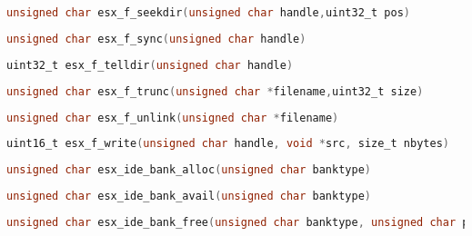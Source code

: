 \documentclass[11pt]{book}
\def\lthtmlcheckvsize{\ifdim\ht\sizebox<\vsize 
  \ifdim\wd\sizebox<\hsize\expandafter\hfill\fi \expandafter\vfill
  \else\expandafter\vss\fi}%
\begin{document}
{\newpage\clearpage
{}%
\begin{lstlisting}[language=C]
unsigned char esx_f_seekdir(unsigned char handle,uint32_t pos)
\end{lstlisting}%
\lthtmlfigureZ
\lthtmlcheckvsize\clearpage}

{\newpage\clearpage
{}%
\begin{lstlisting}[language=C]
unsigned char esx_f_sync(unsigned char handle)
\end{lstlisting}%
\lthtmlfigureZ
\lthtmlcheckvsize\clearpage}

{\newpage\clearpage
{}%
\begin{lstlisting}[language=C]
uint32_t esx_f_telldir(unsigned char handle)
\end{lstlisting}%
\lthtmlfigureZ
\lthtmlcheckvsize\clearpage}

{\newpage\clearpage
{}%
\begin{lstlisting}[language=C]
unsigned char esx_f_trunc(unsigned char *filename,uint32_t size)
\end{lstlisting}%
\lthtmlfigureZ
\lthtmlcheckvsize\clearpage}

{\newpage\clearpage
{}%
\begin{lstlisting}[language=C]
unsigned char esx_f_unlink(unsigned char *filename)
\end{lstlisting}%
\lthtmlfigureZ
\lthtmlcheckvsize\clearpage}

{\newpage\clearpage
{}%
\begin{lstlisting}[language=C]
uint16_t esx_f_write(unsigned char handle, void *src, size_t nbytes)
\end{lstlisting}%
\lthtmlfigureZ
\lthtmlcheckvsize\clearpage}

{\newpage\clearpage
{}%
\begin{lstlisting}[language=C]
unsigned char esx_ide_bank_alloc(unsigned char banktype)
\end{lstlisting}%
\lthtmlfigureZ
\lthtmlcheckvsize\clearpage}

{\newpage\clearpage
{}%
\begin{lstlisting}[language=C]
unsigned char esx_ide_bank_avail(unsigned char banktype)
\end{lstlisting}%
\lthtmlfigureZ
\lthtmlcheckvsize\clearpage}

{\newpage\clearpage
{}%
\begin{lstlisting}[language=C]
unsigned char esx_ide_bank_free(unsigned char banktype, unsigned char page)
\end{lstlisting}%
\lthtmlfigureZ
\lthtmlcheckvsize\clearpage}
\end{document}
